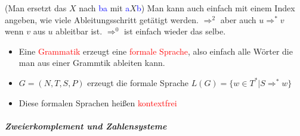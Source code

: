 \documentclass[12pt]{article}
\begin{document}
\begin{flushleft}
\begin{itemize}
        (Man ersetzt das $X$ nach \textcolor{blue}{ba} mit \textcolor{blue}{a}$X$\textcolor{blue}{b}) \linebreak
        \linebreak
        Man kann auch einfach mit einem Index angeben, wie viele Ableitungsschritt getätigt werden. \linebreak
        $\Rightarrow^2$ aber auch $u \Rightarrow^\ast v$ wenn $v$ aus $u$ ableitbar ist. $\Rightarrow^0$ ist einfach wieder das selbe.
        \begin{itemize}
            \item Eine \textcolor{red}{Grammatik} erzeugt eine \textcolor{red}{formale Sprache}, also einfach alle Wörter die man aus einer Grammtik ableiten kann.
            \item $G = (N,T,S,P)$ erzeugt die formale Sprache $L(G) = \{w \in T^* | S \Rightarrow^\ast w\}$
            \item Diese formalen Sprachen heißen \textcolor{red}{kontextfrei}
        \end{itemize}
    \end{itemize}
\end{flushleft}
\pagebreak
\large\subparagraph{\large Zweierkomplement und Zahlensysteme}
\normalsize
\end{document}

